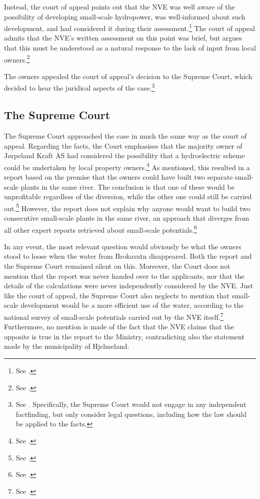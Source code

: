 Instead, the court of appeal points out that the NVE was well aware of the possibility of developing small-scale hydropower, was well-informed about such development, and had considered it during their assessment.\footnote{See \cite[9]{jorpeland11a}.} The court of appeal admits that the NVE's written assessment on this point was brief, but argues that this must be understood as a natural response to the lack of input from local owners.\footnote{See \cite[9]{jorpeland11a}.}

The owners appealed the court of appeal's decision to the Supreme Court, which decided to hear the  juridical aspects of the case.\footnote{See \cite[8]{jorpeland11}. Specifically, the Supreme Court would not engage in any independent factfinding, but only consider legal questions, including how the law should be applied to the facts.}

\subsection{The Supreme Court}

The Supreme Court approached the case in much the same way as the court of appeal. Regarding the facts, the Court emphasises that the majority owner of Jørpeland Kraft AS had considered the possibility that a hydroelectric scheme could be undertaken by local property owners.\footnote{See \cite[53]{jorpeland11}.} As mentioned, this resulted in a report based on the premise that the owners could have built two separate small-scale plants in the same river. The conclusion is that one of these would be unprofitable regardless of the diversion, while the other one could still be carried out.\footnote{See \cite[23]{jorpeland09}.} However, the report does not explain why anyone would want to build two consecutive small-scale plants in the same river, an approach that diverges from all other expert reports retrieved about small-scale potentials.\footnote{See \cite[16|23]{jorpeland09}.}

In any event, the most relevant question would obviously be what the owners stood to loose when the water from Brokavatn disappeared. Both the report and the Supreme Court remained silent on this. Moreover, the Court does not mention that the report was never handed over to the applicants, nor that the details of the calculations were never independently considered by the NVE. Just like the court of appeal, the Supreme Court also neglects to mention that small-scale development would be a more efficient use of the water, according to the national survey of small-scale potentials carried out by the NVE itself.\footnote{See \cite[16]{jorpeland09}.} Furthermore, no mention is made of the fact that the NVE claims that the opposite is true in the report to the Ministry, contradicting also the statement made by the municipality of Hjelmeland.

